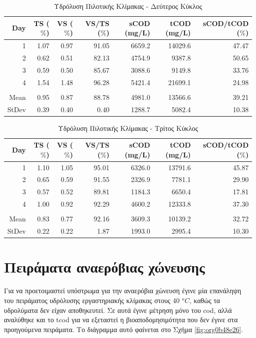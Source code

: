 \documentclass[11pt]{report}
\begin{document}
\pagebreak

\begin{table}[htbp]
\caption{\label{tab:org37dbd5b}Υδρόλυση Πιλοτικής Κλίμακας - Δεύτερος Κύκλος}
\centering
\begin{tabular}{rrrrrrr}
Day & TS (\(\%\)) & VS (\(\%\)) & VS/TS (\(\%\)) & sCOD (mg/L) & tCOD (mg/L) & sCOD/tCOD (\(\%\))\\[0pt]
\hline
1 & 1.07 & 0.97 & 91.05 & 6659.2 & 14029.6 & 47.47\\[0pt]
2 & 0.62 & 0.51 & 82.13 & 4754.9 & 9387.8 & 50.65\\[0pt]
3 & 0.59 & 0.50 & 85.67 & 3088.6 & 9149.8 & 33.76\\[0pt]
4 & 1.54 & 1.48 & 96.28 & 5421.4 & 21699.1 & 24.98\\[0pt]
 &  &  &  &  &  & \\[0pt]
Mean & 0.95 & 0.87 & 88.78 & 4981.0 & 13566.6 & 39.21\\[0pt]
StDev & 0.39 & 0.40 & 0.40 & 1288.7 & 5082.4 & 10.38\\[0pt]
\end{tabular}
\end{table}

\begin{table}[htbp]
\caption{\label{tab:orgb310d7d}Υδρόλυση Πιλοτικής Κλίμακας - Τρίτος Κύκλος}
\centering
\begin{tabular}{rrrrrrr}
Day & TS (\(\%\)) & VS (\(\%\)) & VS/TS (\(\%\)) & sCOD (mg/L) & tCOD (mg/L) & sCOD/tCOD (\(\%\))\\[0pt]
\hline
1 & 1.10 & 1.05 & 95.01 & 6326.0 & 13791.6 & 45.87\\[0pt]
2 & 0.65 & 0.59 & 91.55 & 2326.9 & 7781.1 & 29.90\\[0pt]
3 & 0.57 & 0.52 & 89.81 & 1184.3 & 6650.4 & 17.81\\[0pt]
4 & 1.00 & 0.92 & 92.29 & 4600.2 & 12333.8 & 37.30\\[0pt]
 &  &  &  &  &  & \\[0pt]
Mean & 0.83 & 0.77 & 92.16 & 3609.3 & 10139.2 & 32.72\\[0pt]
StDev & 0.22 & 0.22 & 1.87 & 1993.0 & 2995.4 & 10.30\\[0pt]
\end{tabular}
\end{table}

\section{Πειράματα αναερόβιας χώνευσης}
\label{sec:orgbf70257}
Για να προετοιμαστεί υπόστρωμα για την αναερόβια χώνευση έγινε μία επανάληψη του πειράματος υδρόλυσης εργαστηριακής κλίμακας στους 40 \(^oC\), καθώς τα υδρολύματα δεν είχαν αποθηκευτεί. Σε αυτά έγινε μέτρηση μόνο του \acrshort{cod}, αλλά αναλύθηκε και το \acrfull{tcod} για να εξεταστεί η βιοαποδομησιμότητα που δεν έγινε στα προηγούμενα πειράματα. Το διάγραμμα αυτό φαίνεται στο Σχήμα \ref{fig:org0b48e26}.
\end{document}
